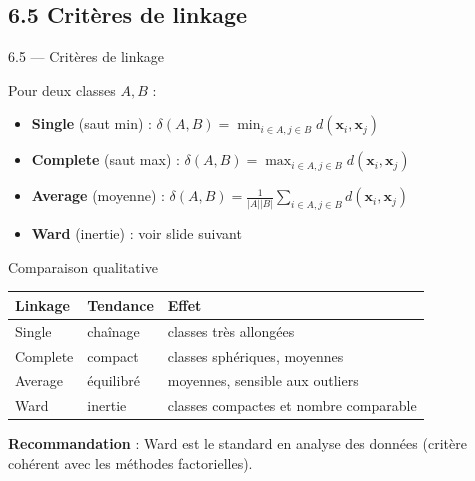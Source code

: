 \subsection{6.5 Critères de linkage}
\begin{frame}{6.5 — Critères de linkage}
\begin{definition}
Pour deux classes $A, B$ :
\begin{itemize}\small
  \item \textbf{Single} (saut min) :
        $\delta(A,B) = \min_{i \in A, j \in B} d(\mathbf{x}_i, \mathbf{x}_j)$
  \item \textbf{Complete} (saut max) :
        $\delta(A,B) = \max_{i \in A, j \in B} d(\mathbf{x}_i, \mathbf{x}_j)$
  \item \textbf{Average} (moyenne) :
        $\delta(A,B) = \frac{1}{|A||B|}\sum_{i \in A, j \in B} d(\mathbf{x}_i, \mathbf{x}_j)$
  \item \textbf{Ward} (inertie) : voir slide suivant
\end{itemize}
\end{definition}

\begin{block}{Comparaison qualitative}
\centering
\footnotesize
\begin{tabular}{l|l|l}
\toprule
Linkage & Tendance & Effet \\
\midrule
Single   & chaînage & classes très allongées \\
Complete & compact  & classes sphériques, moyennes \\
Average  & équilibré& moyennes, sensible aux outliers \\
Ward     & inertie  & classes \alert{compactes} et \alert{nombre comparable} \\
\bottomrule
\end{tabular}
\end{block}

\begin{rema}
\small \textbf{Recommandation} : Ward est le standard en analyse des données
(critère cohérent avec les méthodes factorielles).
\end{rema}
\end{frame}

